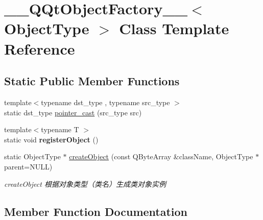 \hypertarget{class_____q_qt_object_factory____}{}\section{\+\_\+\+\_\+\+Q\+Qt\+Object\+Factory\+\_\+\+\_\+$<$ Object\+Type $>$ Class Template Reference}
\label{class_____q_qt_object_factory____}
\subsection*{Static Public Member Functions}
\begin{DoxyCompactItemize}
\item 
{\footnotesize template$<$typename dst\+\_\+type , typename src\+\_\+type $>$ }\\static dst\+\_\+type \mbox{\hyperlink{class_____q_qt_object_factory_____a25df0d6e1a24fd1a9c263768aad1e201}{pointer\+\_\+cast}} (src\+\_\+type src)
\item 
\mbox{\label{class_____q_qt_object_factory_____a436336401d9a2da36b4b72f031cb421e}} 
{\footnotesize template$<$typename T $>$ }\\static void {\bfseries register\+Object} ()
\item 
static Object\+Type $\ast$ \mbox{\hyperlink{class_____q_qt_object_factory_____a03b47defef4d5bb4e167ecda34e041cc}{create\+Object}} (const Q\+Byte\+Array \&class\+Name, Object\+Type $\ast$parent=N\+U\+LL)
\begin{DoxyCompactList}\small\item\em create\+Object 根据对象类型（类名）生成类对象实例 \end{DoxyCompactList}\end{DoxyCompactItemize}


\subsection{Member Function Documentation}
\mbox{\label{class_____q_qt_object_factory_____a03b47defef4d5bb4e167ecda34e041cc}} 
